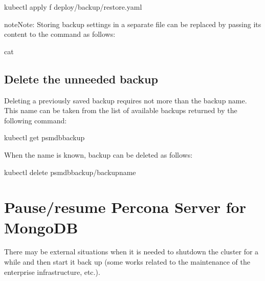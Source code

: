 \documentclass[letterpaper,10pt,english]{sphinxmanual}
\begin{document}
\begin{sphinxVerbatim}[commandchars=\\\{\}]
kubectl apply \PYGZhy{}f deploy/backup/restore.yaml
\end{sphinxVerbatim}

\begin{sphinxadmonition}{note}{Note:}
Storing backup settings in a separate file can be replaced by
passing its content to the  command as follows:

\begin{sphinxVerbatim}[commandchars=\\\{\}]
cat 
\end{sphinxVerbatim}
\end{sphinxadmonition}


\section{Delete the unneeded backup}
\label{\detokenize{backups:delete-the-unneeded-backup}}
Deleting a previously saved backup requires not more than the backup
name. This name can be taken from the list of available backups returned
by the following command:

\begin{sphinxVerbatim}[commandchars=\\\{\}]
kubectl get psmdb\PYGZhy{}backup
\end{sphinxVerbatim}

When the name is known, backup can be deleted as follows:

\begin{sphinxVerbatim}[commandchars=\\\{\}]
kubectl delete psmdb\PYGZhy{}backup/\PYGZlt{}backup\PYGZhy{}name\PYGZgt{}
\end{sphinxVerbatim}


\chapter{Pause/resume Percona Server for MongoDB}
\label{\detokenize{pause:operator-pause}}\label{\detokenize{pause:id1}}\label{\detokenize{pause::doc}}
There may be external situations when it is needed to shutdown the cluster
for a while and then start it back up (some works related to the maintenance of
the enterprise infrastructure, etc.).
\end{document}
